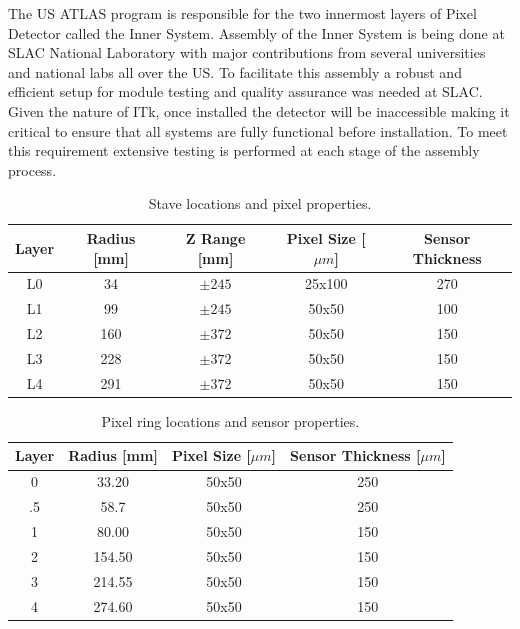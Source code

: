 The US ATLAS program is responsible for the two innermost layers of Pixel Detector called the Inner System. 
Assembly of the Inner System is being done at SLAC National Laboratory with major contributions from several universities and national labs all over the US. 
To facilitate this assembly a robust and efficient setup for module testing and quality assurance was needed at SLAC. 
Given the nature of ITk, once installed the detector will be inaccessible making it critical to ensure that all systems are fully functional before installation. 
To meet this requirement extensive testing is performed at each stage of the assembly process. 


\begin{table}[h]
\centering
\begin{tabular}{|c|c|c|c|c|}
\hline
Layer & Radius [mm] & Z Range [mm] & Pixel Size [$\mu m$] & Sensor Thickness \\
\hline
L0 & 34  & $\pm245$ & 25x100 & 270 \\
L1 & 99  & $\pm245$ & 50x50 & 100 \\
L2 & 160 & $\pm372$ & 50x50 & 150 \\
L3 & 228 & $\pm372$ & 50x50 & 150 \\
L4 & 291 & $\pm372$ & 50x50 & 150 \\

\hline
\end{tabular}
\caption{Stave locations and pixel properties.}
\label{tab:barrel_locations}
\end{table}


\begin{table}[h]
\centering
\begin{tabular}{|c|c|c|c|}
\hline
Layer & Radius [mm] & Pixel Size [$\mu m$] & Sensor Thickness [$\mu m$] \\
\hline
0  & 33.20    & 50x50 & 250 \\
.5 & 58.7     & 50x50 & 250 \\
1  & 80.00    & 50x50 & 150 \\
2  & 154.50   & 50x50 & 150 \\
3  & 214.55   & 50x50 & 150 \\
4  & 274.60   & 50x50 & 150 \\

\hline
\end{tabular}
\caption{Pixel ring locations and sensor properties.}
\label{tab:ring_locations}
\end{table}


